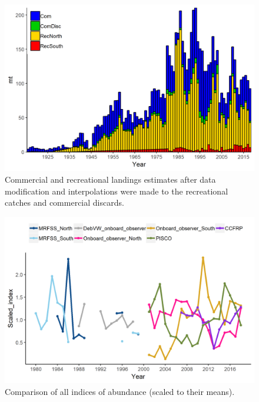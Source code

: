 \documentclass[12pt,]{article}
\begin{document}
\begin{figure}
\centering
\includegraphics{Figures/Catches_alternate.png}
\caption{Commercial and recreational landings estimates after data
modification and interpolations were made to the recreational catches
and commercial discards. \label{fig:Catches_alternate}}
\end{figure}

\FloatBarrier

\begin{figure}
\centering
\includegraphics{Figures/All_index_compare.png}
\caption{Comparison of all indices of abundance (scaled to their means).
\label{fig:All_index_compare}}
\end{figure}
\end{document}

